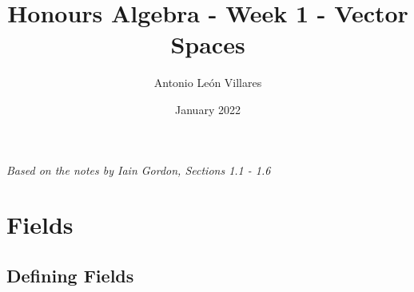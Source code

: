 \documentclass{exam}
\title{Honours Algebra - Week 1 - Vector Spaces}
\author{Antonio León Villares}
\date{January 2022}
\begin{document}
\maketitle

\tableofcontents

\pagebreak

\textit{Based on the notes by Iain Gordon, Sections 1.1 - 1.6}

\section{Fields}

\subsection{Defining Fields}
\end{document}
